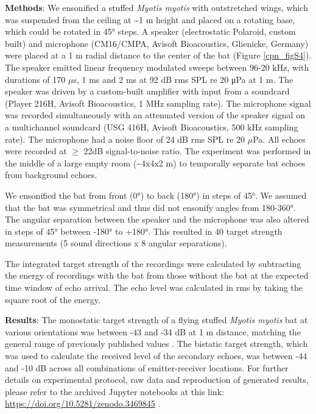 \documentclass[
]{book}
\begin{document}
\textbf{Methods}: We ensonified a stuffed \emph{Myotis myotis} with outstretched wings, which was suspended from the ceiling at \textasciitilde1 m height and placed on a rotating base, which could be rotated in 45° steps. A speaker (electrostatic Polaroid, custom built) and microphone (CM16/CMPA, Avisoft Bioacoustics, Glienicke, Germany) were placed at a 1 m radial distance to the center of the bat (Figure \ref{cpn_figS4}). The speaker emitted linear frequency modulated sweeps between 96-20 kHz, with durations of 170 \(\mu\)s, 1 ms and 2 ms at 92 dB rms SPL re 20 μPa at 1 m. The speaker was driven by a custom-built amplifier with input from a soundcard (Player 216H, Avisoft Bioacoustics, 1 MHz sampling rate). The microphone signal was recorded simultaneously with an attenuated version of the speaker signal on a multichannel soundcard (USG 416H, Avisoft Bioacoustics, 500 kHz sampling rate). The microphone had a noise floor of 24 dB rms SPL re 20 \(\mu\)Pa. All echoes were recorded at \(\geq\) 22dB signal-to-noise ratio. The experiment was performed in the middle of a large empty room (\textasciitilde4x4x2 m) to temporally separate bat echoes from background echoes.

We ensonified the bat from front (0°) to back (180°) in steps of 45°. We assumed that the bat was symmetrical and thus did not ensonify angles from 180-360°. The angular separation between the speaker and the microphone was also altered in steps of 45° between -180° to +180°. This resulted in 40 target strength measurements (5 sound directions x 8 angular separations).

The integrated target strength \citep{j1985a} of the recordings were calculated by subtracting the energy of recordings with the bat from those without the bat at the expected time window of echo arrival. The echo level was calculated in rms by taking the square root of the energy.

\textbf{Results}: The monostatic target strength of a flying stuffed \emph{Myotis myotis} bat at various orientations was between -43 and -34 dB at 1 m distance, matching the general range of previously published values \citep{goetze2016a}. The bistatic target strength, which was used to calculate the received level of the secondary echoes, was between -44 and -10 dB across all combinations of emitter-receiver locations. For further details on experimental protocol, raw data and reproduction of generated results, please refer to the archived Jupyter notebooks at this link: \url{https://doi.org/10.5281/zenodo.3469845} .
\end{document}
